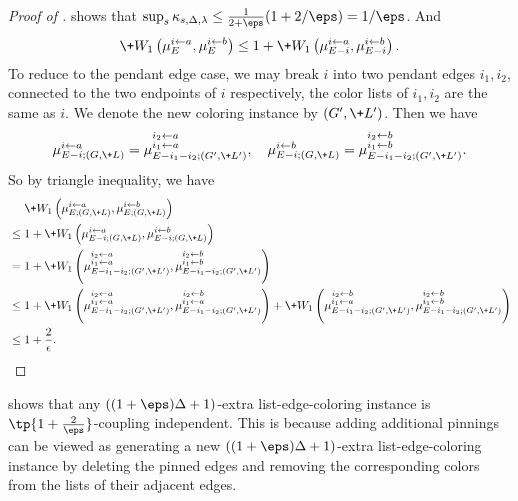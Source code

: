 \documentclass[a4paper,11pt]{article}
\newcommand{\pin}{\leftarrow}
\newcommand{\W}[1]{\+W_1\left(#1\right)}
\begin{document}
\begin{proof}[Proof of ]
     shows that $\sup_{s}\kappa_{s, \Delta, \lambda}\le \frac{1}{2+\eps}(1+2/\eps) = 1/\eps$.
    And
    \begin{align*}
        \W{\mu_{E}^{i\pin a}, \mu_{E}^{i\pin b}} \le 1 + \W{\mu_{E-i}^{i\pin a}, \mu_{E-i}^{i\pin b}}.
    \end{align*}
    To reduce to the pendant edge case,
    we may break $i$ into two pendant edges $i_1, i_2$,
    connected to the two endpoints of $i$ respectively,
    the color lists of $i_1, i_2$ are the same as $i$.
    We denote the new coloring instance by $(G',\+L')$.
    Then we have
    \begin{align*}
    \mu_{E-i      ; (G , \+L )}^{i\pin a} =
    \mu_{E-i_1-i_2; (G', \+L')}^{\substack{i_2\pin a \\ i_1\pin a}},
    \quad
    \mu_{E-i      ; (G , \+L )}^{i\pin b} =
    \mu_{E-i_1-i_2; (G', \+L')}^{\substack{i_2\pin b \\ i_1\pin b}}.
    \end{align*}
    So by triangle inequality, we have
    \begin{align*}
    &\phantom{{}={}}\W{\mu_{E;(G,\+L)}^{i\pin a}, \mu_{E;(G,\+L)}^{i\pin b}}
    \\&\le
    1 + \W{\mu_{E-i; (G,\+L)}^{i\pin a}, \mu_{E-i;(G,\+L)}^{i\pin b}}
    \\&=
    1 + 
    \W{
    \mu_{E-i_1-i_2; (G', \+L')}^{\substack{i_2\pin a \\ i_1\pin a}},
    \mu_{E-i_1-i_2; (G', \+L')}^{\substack{i_2\pin b \\ i_1\pin b}}
    }
    \\&\le
    1 + 
    \W{
    \mu_{E-i_1-i_2; (G', \+L')}^{\substack{i_2\pin a \\ i_1\pin a}},
    \mu_{E-i_1-i_2; (G', \+L')}^{\substack{i_2\pin b \\ i_1\pin a}}
    }
    +
    \W{
    \mu_{E-i_1-i_2; (G', \+L')}^{\substack{i_2\pin b \\ i_1\pin a}},
    \mu_{E-i_1-i_2; (G', \+L')}^{\substack{i_2\pin b \\ i_1\pin b}}
    }
    \\&\le
    1 + \frac{2}{\epsilon}.
    \end{align*}
\end{proof}

 shows that any $((1+\eps)\Delta+1)$-extra list-edge-coloring instance is $\tp{1+ \frac{2}{\eps}}$-coupling independent. This is because adding additional pinnings can be viewed as generating a new $((1+\eps)\Delta+1)$-extra list-edge-coloring instance by deleting the pinned edges and removing the corresponding colors from the lists of their adjacent edges. 
\end{document}
